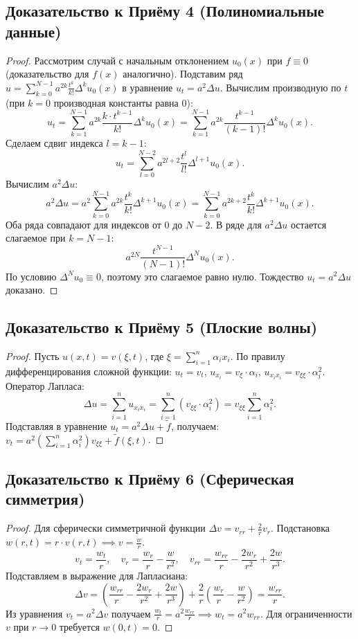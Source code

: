 \subsection*{Доказательство к Приёму 4 (Полиномиальные данные)}
\begin{proof}
Рассмотрим случай с начальным отклонением $u_0(x)$ при $f \equiv 0$ (доказательство для $f(x)$ аналогично). Подставим ряд $u = \sum_{k=0}^{N-1} a^{2k} \frac{t^k}{k!} \Delta^k u_0(x)$ в уравнение $u_t = a^2\Delta u$.
Вычислим производную по $t$ (при $k=0$ производная константы равна 0):
\[
u_t = \sum_{k=1}^{N-1} a^{2k} \frac{k \cdot t^{k-1}}{k!} \Delta^k u_0(x) = \sum_{k=1}^{N-1} a^{2k} \frac{t^{k-1}}{(k-1)!} \Delta^k u_0(x).
\]
Сделаем сдвиг индекса $l = k - 1$:
\[
u_t = \sum_{l=0}^{N-2} a^{2l+2} \frac{t^l}{l!} \Delta^{l+1} u_0(x).
\]
Вычислим $a^2\Delta u$:
\[
a^2\Delta u = a^2 \sum_{k=0}^{N-1} a^{2k} \frac{t^k}{k!} \Delta^{k+1} u_0(x) = \sum_{k=0}^{N-1} a^{2k+2} \frac{t^k}{k!} \Delta^{k+1} u_0(x).
\]
Оба ряда совпадают для индексов от $0$ до $N-2$. В ряде для $a^2\Delta u$ остается слагаемое при $k = N-1$:
\[ a^{2N} \frac{t^{N-1}}{(N-1)!} \Delta^N u_0(x). \]
По условию $\Delta^N u_0 \equiv 0$, поэтому это слагаемое равно нулю. Тождество $u_t = a^2\Delta u$ доказано.
\end{proof}

\subsection*{Доказательство к Приёму 5 (Плоские волны)}
\begin{proof}
Пусть $u(x,t) = v(\xi, t)$, где $\xi = \sum_{i=1}^n \alpha_i x_i$. По правилу дифференцирования сложной функции:
$u_t = v_t$, $u_{x_i} = v_\xi \cdot \alpha_i$, $u_{x_i x_i} = v_{\xi\xi} \cdot \alpha_i^2$. Оператор Лапласа:
\[
\Delta u = \sum_{i=1}^n u_{x_i x_i} = \sum_{i=1}^n \left( v_{\xi\xi} \cdot \alpha_i^2 \right) = v_{\xi\xi} \sum_{i=1}^n \alpha_i^2.
\]
Подставляя в уравнение $u_t = a^2\Delta u + \tilde{f}$, получаем: $v_t = a^2 \left(\sum_{i=1}^n \alpha_i^2 \right) v_{\xi\xi} + \tilde{f}(\xi, t)$.
\end{proof}

\subsection*{Доказательство к Приёму 6 (Сферическая симметрия)}
\begin{proof}
Для сферически симметричной функции $\Delta v = v_{rr} + \frac{2}{r}v_r$. Подстановка $w(r,t) = r \cdot v(r,t) \implies v = \frac{w}{r}$.
\[
v_t = \frac{w_t}{r}, \quad v_r = \frac{w_r}{r} - \frac{w}{r^2}, \quad v_{rr} = \frac{w_{rr}}{r} - \frac{2w_r}{r^2} + \frac{2w}{r^3}.
\]
Подставляем в выражение для Лапласиана:
\[
\Delta v = \left( \frac{w_{rr}}{r} - \frac{2w_r}{r^2} + \frac{2w}{r^3} \right) + \frac{2}{r} \left( \frac{w_r}{r} - \frac{w}{r^2} \right) = \frac{w_{rr}}{r}.
\]
Из уравнения $v_t = a^2\Delta v$ получаем $\frac{w_t}{r} = a^2 \frac{w_{rr}}{r} \implies w_t = a^2 w_{rr}$. Для ограниченности $v$ при $r \to 0$ требуется $w(0, t) = 0$.
\end{proof}

